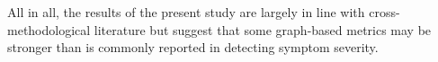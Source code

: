 All in all, the results of the present study are largely in line with cross-methodological literature but suggest that some graph-based metrics may be stronger than is commonly reported in detecting symptom severity.





